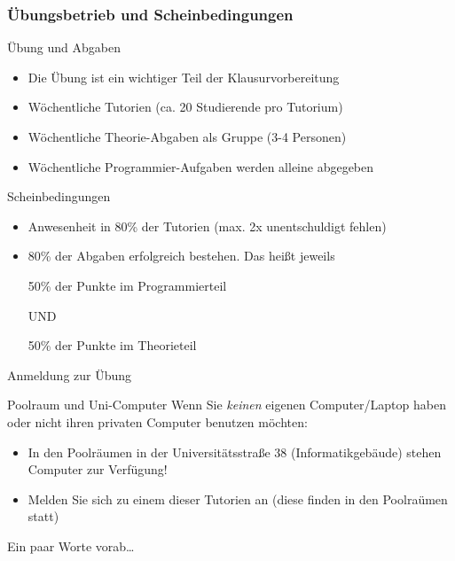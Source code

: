 \documentclass{../../presentation}
\begin{document}
\begin{frame}[fragile]
  \frametitle{Übungsbetrieb und Scheinbedingungen}

  Übung und Abgaben
  \begin{itemize}
    \item Die Übung ist ein wichtiger Teil der Klausurvorbereitung
    \item Wöchentliche Tutorien (ca. 20 Studierende pro Tutorium)
    \item Wöchentliche Theorie-Abgaben als Gruppe (3-4 Personen)
    \item Wöchentliche Programmier-Aufgaben werden alleine abgegeben
  \end{itemize}

  \vspace{0.5cm}

  Scheinbedingungen
  \begin{itemize}
    \item Anwesenheit in 80\% der Tutorien (max. 2x unentschuldigt fehlen)
    \item 80\% der Abgaben erfolgreich bestehen. Das heißt jeweils
      \begin{center}
      50\% der Punkte im Programmierteil

      UND

      50\% der Punkte im Theorieteil
      \end{center}
  \end{itemize}
\end{frame}

\begin{frame}{Anmeldung zur Übung}
\end{frame}

\begin{frame}{Poolraum und Uni-Computer}
  Wenn Sie \emph{keinen} eigenen Computer/Laptop haben oder nicht ihren privaten Computer benutzen möchten:
  \begin{itemize}
    \item In den Poolräumen in der Universitätsstraße 38 (Informatikgebäude) stehen Computer zur Verfügung!
    \item Melden Sie sich zu einem dieser Tutorien an (diese finden in den Poolraümen statt)
  \end{itemize}
\end{frame}


\begin{frame}[fragile]
  \begin{center}
    \Large
    Ein paar Worte vorab\ldots
  \end{center}
\end{frame}
\end{document}

